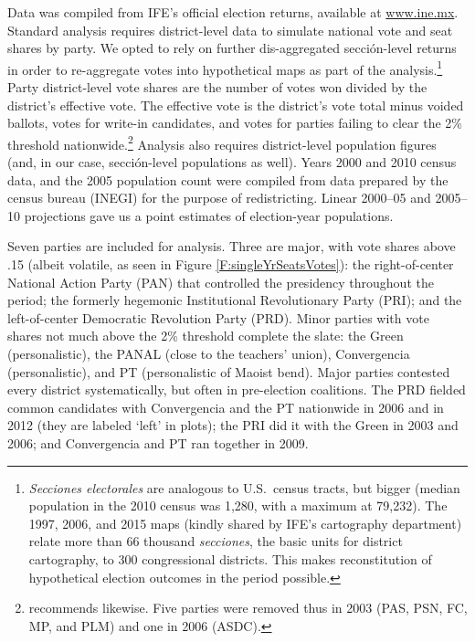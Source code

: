 \documentclass[letter,12pt]{article}
\begin{document}
Data was compiled from IFE's official election returns, available at \url{www.ine.mx}. Standard analysis requires district-level data to simulate national vote and seat shares by party. We opted to rely on further dis-aggregated secci\'on-level returns in order to re-aggregate votes into hypothetical maps as part of the analysis.\footnote{\emph{Secciones electorales} are analogous to U.S.\ census tracts, but bigger (median population in the 2010 census was 1,280, with a maximum at 79,232). The 1997, 2006, and 2015 maps (kindly shared by IFE's cartography department) relate more than 66 thousand \emph{secciones}, the basic units for district cartography, to 300 congressional districts. This makes reconstitution of hypothetical election outcomes in the period possible.} Party district-level vote shares are the number of votes won divided by the district's effective vote. The effective vote is the district's vote total minus voided ballots, votes for write-in candidates, and votes for parties failing to clear the 2\% threshold nationwide.\footnote{\citet[][:fn. 4]{linzerSeatVoteElasticity2012} recommends likewise. Five parties were removed thus in 2003 (PAS, PSN, FC, MP, and PLM) and one in 2006 (ASDC).} Analysis also requires district-level population figures (and, in our case, secci\'on-level populations as well). Years 2000 and 2010 census data, and the 2005 population count were compiled from data prepared by the census bureau (INEGI) for the purpose of redistricting. Linear 2000--05 and 2005--10 projections gave us a point estimates of election-year populations. 

Seven parties are included for analysis. Three are major, with vote shares above .15 (albeit volatile, as seen in Figure \ref{F:singleYrSeatsVotes}): the right-of-center National Action Party (PAN) that controlled the presidency throughout the period; the formerly hegemonic Institutional Revolutionary Party (PRI); and the left-of-center Democratic Revolution Party (PRD). Minor parties with vote shares not much above the 2\% threshold complete the slate: the Green (personalistic), the PANAL (close to the teachers' union), Convergencia (personalistic), and PT (personalistic of Maoist bend). Major parties contested every district systematically, but often in pre-election coalitions. The PRD fielded common candidates with Convergencia and the PT nationwide in 2006 and in 2012 (they are labeled `left' in plots); the PRI did it with the Green in 2003 and 2006; and Convergencia and PT ran together in 2009. 
\end{document}
